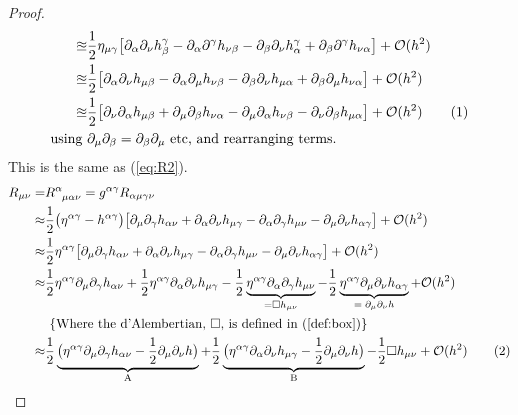 \documentclass[]{article}
\newcommand\numberthis{\addtocounter{equation}{1}\tag{\theequation}}
\begin{document}
\begin{proof}
\begin{align*}
	\approxeq&\frac{1}{2}\eta_{\mu\gamma}\big[ \partial_{\alpha}\partial_{\nu}h^{\gamma}_{\beta}-\partial_{\alpha}\partial^{\gamma}h_{\nu\beta}  -\partial_{\beta}\partial_{\nu}h^{\gamma}_{\alpha}+\partial_{\beta}\partial^{\gamma}h_{\nu\alpha}  \big]+ \mathcal{O}(h^2)
	\\
	\approxeq&\frac{1}{2}\big[ \partial_{\alpha}\partial_{\nu}h_{\mu\beta}-\partial_{\alpha}\partial_{\mu}h_{\nu\beta}  -\partial_{\beta}\partial_{\nu}h_{\mu\alpha}+\partial_{\beta}\partial_{\mu}h_{\nu\alpha}  \big]+ \mathcal{O}(h^2)\\
	\approxeq&\frac{1}{2}\big[\partial_{\nu}\partial_{\alpha}h_{\mu\beta} + \partial_{\mu}\partial_{\beta}h_{\nu\alpha} - \partial_{\mu}\partial_{\alpha}h_{\nu\beta} - \partial_{\nu}\partial_{\beta}h_{\mu\alpha}\big]+ \mathcal{O}(h^2) \numberthis\label{eq:R}\\
	\text{using }& \partial_{\mu}\partial_{\beta}=\partial_{\beta}\partial_{\mu} \text{ etc, and rearranging terms.}
	\end{align*}
	This is the same as (\ref{eq:R2}).
	\begin{align*}
	R_{\mu\nu} =& R\indices{^\alpha_{\mu\alpha\nu}} = g^{\alpha\gamma}R_{\alpha\mu\gamma\nu}\\
	\approx&\frac{1}{2} \big(\eta^{\alpha\gamma}- h^{\alpha\gamma}\big) \big[\partial_{\mu}\partial_{\gamma}h_{\alpha\nu} + \partial_{\alpha}\partial_{\nu}h_{\mu\gamma} - \partial_{\alpha}\partial_{\gamma}h_{\mu\nu} - \partial_{\mu}\partial_{\nu}h_{\alpha\gamma}\big]+ \mathcal{O}(h^2)\\
	\approx&\frac{1}{2} \eta^{\alpha\gamma} \big[\partial_{\mu}\partial_{\gamma}h_{\alpha\nu} + \partial_{\alpha}\partial_{\nu}h_{\mu\gamma} - \partial_{\alpha}\partial_{\gamma}h_{\mu\nu} - \partial_{\mu}\partial_{\nu}h_{\alpha\gamma}\big]+ \mathcal{O}(h^2)\\
	\approx& \frac{1}{2} \eta^{\alpha\gamma}\partial_{\mu}\partial_{\gamma}h_{\alpha\nu} + \frac{1}{2} \eta^{\alpha\gamma}\partial_{\alpha}\partial_{\nu}h_{\mu\gamma}- \frac{1}{2}  \underbrace{\eta^{\alpha\gamma}\partial_{\alpha}\partial_{\gamma}h_{\mu\nu}}_{=\Box h_{\mu\nu}} - \frac{1}{2} \underbrace{\eta^{\alpha\gamma}\partial_{\mu}\partial_{\nu}h_{\alpha\gamma}}_\text{$=\partial_{\mu}\partial_{\nu}h$}+ \mathcal{O}(h^2)\\
	&\text{	\{Where the d'Alembertian, $\Box$, is defined in (\ref{def:box})\}}\\
	\approx& \frac{1}{2}\underbrace{\big(\eta^{\alpha\gamma}\partial_{\mu}\partial_{\gamma}h_{\alpha\nu} -\frac{1}{2}\partial_{\mu}\partial_{\nu}h\big)}_\text{A} + \frac{1}{2}\underbrace{\big(\eta^{\alpha\gamma}\partial_{\alpha}\partial_{\nu}h_{\mu\gamma}-\frac{1}{2}\partial_{\mu}\partial_{\nu}h\big)}_\text{B} -\frac{1}{2}\Box h_{\mu\nu} + \mathcal{O}(h^2)\numberthis\label{eq:gauge}

\end{align*}
\end{proof}
\end{document}

